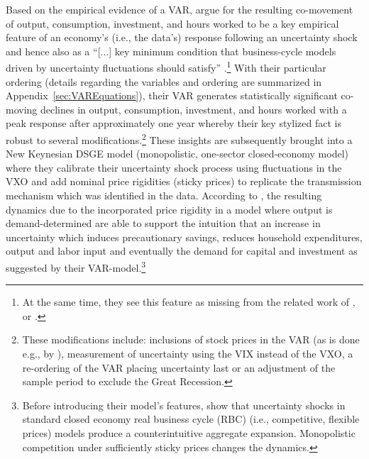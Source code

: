 \documentclass[a4paper,11pt,listof=nochaptergap,oneside,pointednumbers,bibtotoc,bigheadings,liststotoc,hidelinks]{scrbook}
\theoremstyle{mysatz}
\theoremstyle{mydefinition}
\theoremstyle{mytheorem}
\theoremstyle{mybemerkung}
\begin{document}
Based on the empirical evidence of a VAR, \citet{basuandbundick:17} argue for the resulting co-movement of output, consumption, investment, and hours worked to be a key empirical feature of an economy's (i.e., the data's) response following an uncertainty shock and hence also as a ``[...] key minimum condition that business-cycle models driven by uncertainty fluctuations should satisfy'' \citep[p. 937]{basuandbundick:17}.\footnote{At the same time, they see this feature as missing from the related work of \citet{bloom:09}, \citet{bachmannandbayer:13} or \citet{gilchristetal:14}. } With their particular ordering (details regarding the variables and ordering are summarized in Appendix~\ref{sec:VAREquations}), their VAR generates statistically significant co-moving declines in output, consumption, investment, and hours worked with a peak response after approximately one year whereby their key stylized fact is robust to several modifications.\footnote{These modifications include: inclusions of stock prices in the VAR (as is done e.g., by \citealp{bloom:09}), measurement of uncertainty using the VIX instead of the VXO, a re-ordering of the VAR placing uncertainty last or an adjustment of the sample period to exclude the Great Recession.} These insights are subsequently brought into a New Keynesian DSGE model (monopolistic, one-sector closed-economy model) where they calibrate their uncertainty shock process using fluctuations in the VXO and add nominal price rigidities (sticky prices) to replicate the transmission mechanism which was identified in the data. According to \citet{basuandbundick:17}, the resulting dynamics due to the incorporated price rigidity in a model where output is demand-determined are able to support the intuition that an increase in uncertainty which induces precautionary savings, reduces household expenditures, output and labor input and eventually the demand for capital and investment as suggested by their VAR-model.\footnote{Before introducing their model's features, \citet{basuandbundick:17} show that uncertainty shocks in standard closed economy real business cycle (RBC) (i.e., competitive, flexible prices) models produce a counterintuitive aggregate expansion. Monopolistic competition under sufficiently sticky prices changes the dynamics.}\\
\end{document}

